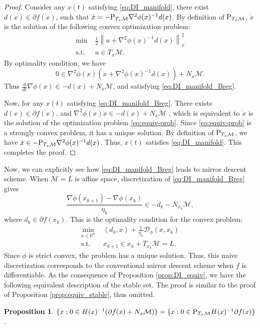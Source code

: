 \documentclass[11pt]{article}
\newcommand{\R}{\mathbb R}
\newcommand{\cD}{\mathcal D}
\newcommand{\cM}{\mathcal M}
\def\norm#1{\left\|#1\right\|}
\def\inner#1{\left\langle#1\right\rangle}
\newtheorem{proposition}{Proposition}[section]
\begin{document}
\begin{proof}
Consider any $x(t)$ satisfying \eqref{eq:DI_manifold}, there exist $d(x)\in\partial f(x)$, such that $\dot x=-{\rm P}_{T_x\cM}\nabla^2\phi(x)^{-1}d(x)$. By definition of ${\rm P}_{T_x\cM}$, $\dot x$ is the solution of the following convex optimization problem: 
\begin{equation}
\begin{aligned}
\min\;&\frac{1}{2}\norm{u+\nabla^2\phi(x)^{-1}d(x)}_x^2\\
\text{s.t. }&u\in T_x\cM.
\end{aligned}
\label{eq:equiv-prob}
\end{equation}
By optimality condition, we have 
\[
0\in\nabla^2\phi(x)(\dot x+\nabla^2\phi(x)^{-1}d(x))+N_x\cM.
\]
Thus $\frac{d}{dt}\nabla\phi(x)\in -d(x)+N_x\cM$, and satisfying \eqref{eq:DI_manifold_Breg}. 

Now, for any $x(t)$ satisfying \eqref{eq:DI_manifold_Breg}. There exists $d(x)\in\partial f(x)$, and $\nabla^2\phi(x)\dot x\in-d(x)+N_x\cM$ , which is equivalent to $\dot x$ is the solution of the optimization problem \eqref{eq:equiv-prob}. Since \eqref{eq:equiv-prob} is a strongly convex problem, it has a unique solution. By definition of ${\rm P}_{T_x\cM}$, we have $\dot x\in-{\rm P}_{T_x\cM}\nabla^2\phi(x)^{-1}d(x)$. Thus, $x(t)$ satisfies \eqref{eq:DI_manifold}. This completes the proof.
\end{proof}
Now, we can explicitly see how \eqref{eq:DI_manifold_Breg} leads to mirror descent scheme. When $\cM=L$ is affine space, discretization of \eqref{eq:DI_manifold_Breg} gives 
\[
\frac{\nabla\phi(x_{k+1})-\nabla\phi(x_k)}{\eta_k}\in-d_k-N_{x_k}\cM,
\]
where $d_k\in\partial f(x_k)$. This is the optimality condition for the convex problem:
\[
\begin{aligned}
    \min_{x\in\R^n}\;&\inner{d_k,x}+\frac{1}{\eta_k}\cD_\phi(x,x_k)\\
    \text{s.t. }&x_{k+1}\in x_k+T_{x_k}\cM=L.
\end{aligned}
\]
Since $\phi$ is strict convex, the problem has a unique solution. Thus, this naive discretization corresponds to the conventional mirror descent scheme when $ f $ is differentiable. As the consequence of Proposition \ref{prop:DI_equiv}, we have the following equivalent description of the stable set. The proof is similar to the proof of Proposition \ref{prop:equiv_stable}, thus omitted.
\begin{proposition}
\label{prop:stable_equiv}
$\{x:0\in H(x)^{-1}(\partial f(x)+N_{x}\cM)\}=\{x:0\in {\rm P}_{T_x\cM}H(x)^{-1}\partial f(x)\}$.
\end{proposition}
\end{document}
